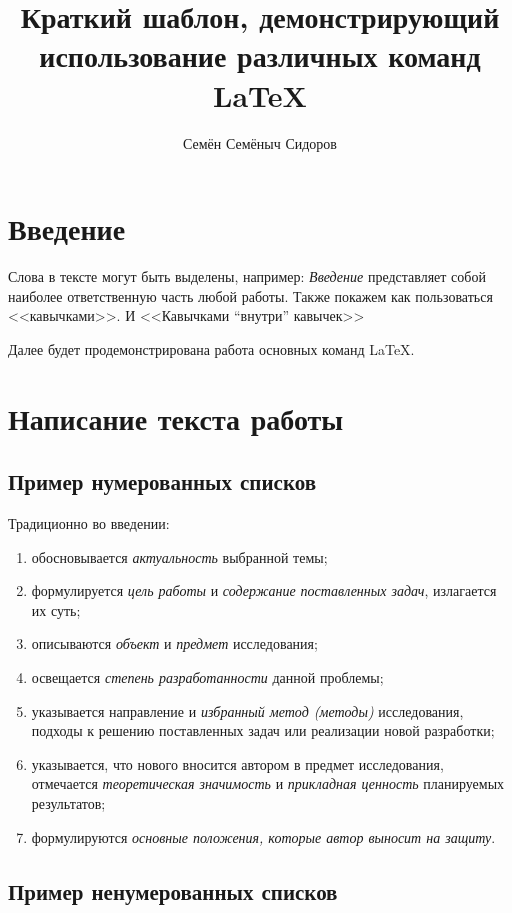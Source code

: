 \documentclass[PI,VKR]{HSEUniversity}
\title{Краткий шаблон, демонстрирующий использование различных команд \LaTeX}
\author{Семён Семёныч Сидоров}
\begin{document}
\maketitle

\chapter*{Введение}

Слова в тексте могут быть выделены, например: \emph{Введение} представляет собой наиболее ответственную часть любой работы.
Также покажем как пользоваться <<кавычками>>. И <<Кавычками ``внутри'' кавычек>>

Далее будет продемонстрирована работа основных команд \LaTeX{}.

\chapter{Написание текста работы}

\section{Пример нумерованных списков}

Традиционно во введении:
\begin{enumerate}
	\item  обосновывается \emph{актуальность} выбранной темы;
	\item  формулируется \emph{цель работы} и \emph{содержание поставленных задач}, излагается их суть;
	\item  описываются \emph{объект} и \emph{предмет} исследования;
	\item  освещается \emph{степень разработанности} данной проблемы;
	\item  указывается направление и \emph{избранный метод (методы)} исследования, подходы к решению поставленных задач или реализации новой разработки;
	\item  указывается, что нового вносится автором в предмет исследования, отмечается \emph{теоретическая значимость} и \emph{прикладная ценность} планируемых результатов;
	\item  формулируются \emph{основные положения, которые автор выносит на защиту}.
\end{enumerate}

\section{Пример ненумерованных списков}
\end{document}
